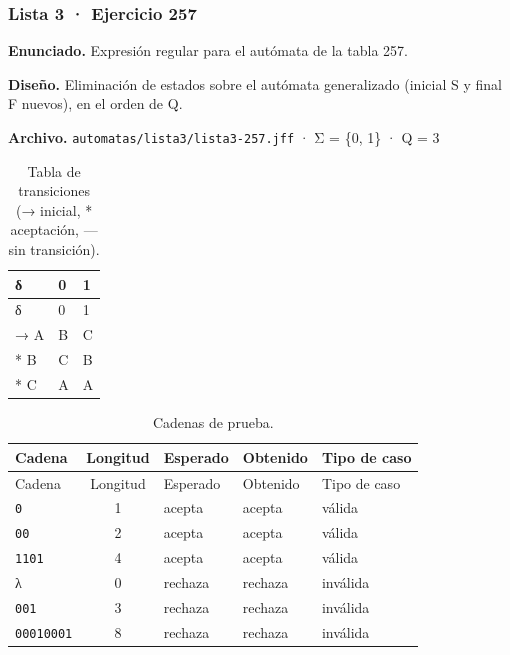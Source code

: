 
\hypertarget{lista-3-ejercicio-257}{%
\subsubsection{Lista 3 · Ejercicio 257}\label{lista-3-ejercicio-257}}

\textbf{Enunciado.} Expresión regular para el autómata de la tabla 257.

\textbf{Diseño.} Eliminación de estados sobre el autómata generalizado (inicial S y final F nuevos), en el orden de Q.

\textbf{Archivo.} \texttt{automatas/lista3/lista3-257.jff} · Σ = \{0, 1\} · \textbar Q\textbar{} = 3

\begin{longtable}[]{@{}lll@{}}
\caption{Tabla de transiciones (→ inicial, * aceptación, --- sin transición).}\tabularnewline
\toprule\noalign{}
δ & 0 & 1 \\
\midrule\noalign{}
\endfirsthead
\toprule\noalign{}
δ & 0 & 1 \\
\midrule\noalign{}
\endhead
\bottomrule\noalign{}
\endlastfoot
→ A & B & C \\
* B & C & B \\
* C & A & A \\
\end{longtable}

\begin{longtable}[]{@{}lclll@{}}
\caption{Cadenas de prueba.}\tabularnewline
\toprule\noalign{}
Cadena & Longitud & Esperado & Obtenido & Tipo de caso \\
\midrule\noalign{}
\endfirsthead
\toprule\noalign{}
Cadena & Longitud & Esperado & Obtenido & Tipo de caso \\
\midrule\noalign{}
\endhead
\bottomrule\noalign{}
\endlastfoot
\texttt{0} & 1 & acepta & acepta & válida \\
\texttt{00} & 2 & acepta & acepta & válida \\
\texttt{1101} & 4 & acepta & acepta & válida \\
λ & 0 & rechaza & rechaza & inválida \\
\texttt{001} & 3 & rechaza & rechaza & inválida \\
\texttt{00010001} & 8 & rechaza & rechaza & inválida \\
\end{longtable}

